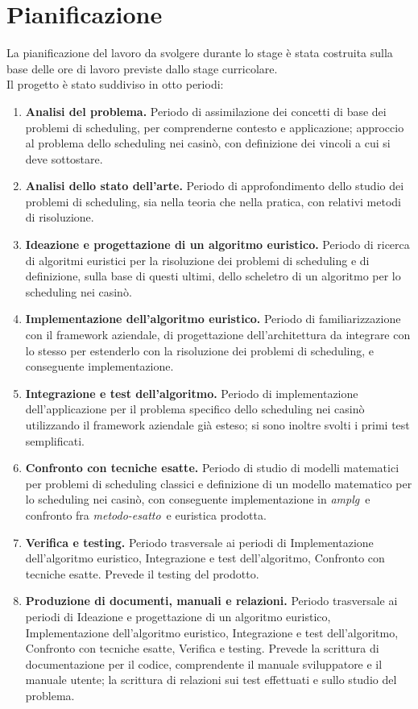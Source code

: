 \section{Pianificazione}
\label{duequattro}
La pianificazione del lavoro da svolgere durante lo stage è stata costruita sulla base delle ore di lavoro previste dallo stage curricolare. \\
Il progetto è stato suddiviso in otto periodi:
\begin{enumerate}
    \item \textbf{Analisi del problema.} Periodo di assimilazione dei concetti di base dei problemi di scheduling, per comprenderne contesto e applicazione; approccio al problema dello scheduling nei casinò, con definizione dei vincoli a cui si deve sottostare.
    \item \textbf{Analisi dello stato dell'arte.} Periodo di approfondimento dello studio dei problemi di scheduling, sia nella teoria che nella pratica, con relativi metodi di risoluzione.
    \item \textbf{Ideazione e progettazione di un algoritmo euristico.} Periodo di ricerca di algoritmi euristici per la risoluzione dei problemi di scheduling e di definizione, sulla base di questi ultimi, dello scheletro di un algoritmo per lo scheduling nei casinò.
    \item \textbf{Implementazione dell'algoritmo euristico.} Periodo di familiarizzazione con il framework aziendale, di progettazione dell'architettura da integrare con lo stesso per estenderlo con la risoluzione dei problemi di scheduling, e conseguente implementazione.
    \item \textbf{Integrazione e test dell'algoritmo.} Periodo di implementazione dell'applicazione per il problema specifico dello scheduling nei casinò utilizzando il framework aziendale già esteso; si sono inoltre svolti i primi test semplificati.
    \item \textbf{Confronto con tecniche esatte.} Periodo di studio di modelli matematici per problemi di scheduling classici e definizione di un modello matematico per lo scheduling nei casinò, con conseguente implementazione in \emph{\gls{amplg}}\glsfirstoccur\ e confronto fra \emph{\gls{metodo-esatto}}\glsfirstoccur\ e euristica prodotta.
    \item \textbf{Verifica e testing.} Periodo trasversale ai periodi di Implementazione dell'algoritmo euristico, Integrazione e test dell'algoritmo, Confronto con tecniche esatte. Prevede il testing del prodotto.
    \item \textbf{Produzione di documenti, manuali e relazioni.} Periodo trasversale ai periodi di Ideazione e progettazione di un algoritmo euristico, Implementazione dell'algoritmo euristico, Integrazione e test dell'algoritmo, Confronto con tecniche esatte, Verifica e testing. Prevede la scrittura di documentazione per il codice, comprendente il manuale sviluppatore e il manuale utente; la scrittura di relazioni sui test effettuati e sullo studio del problema.
\end{enumerate}
